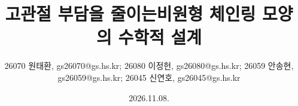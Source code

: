 \title{고관절 부담을 줄이는\linebreak 비원형 체인링 모양의 수학적 설계}
\author{26070 원태환, gs26070@gs.hs.kr; 26080 이정헌, gs26080@gs.hs.kr; 26059 안송현, gs26059@gs.hs.kr; 26045 신연호, gs26045@gs.hs.kr}
\date{2026.11.08.}
